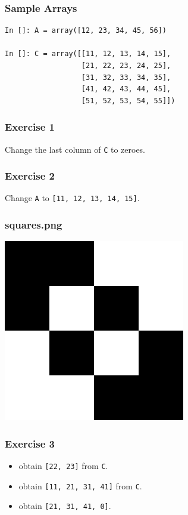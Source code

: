 \documentclass[presentation]{beamer}
\begin{document}
\begin{frame}[fragile]
\frametitle{Sample Arrays}
\label{sec-4}
\lstset{language=Python}
\begin{lstlisting}
In []: A = array([12, 23, 34, 45, 56])

In []: C = array([[11, 12, 13, 14, 15],
                  [21, 22, 23, 24, 25],
                  [31, 32, 33, 34, 35],
                  [41, 42, 43, 44, 45],
                  [51, 52, 53, 54, 55]])
\end{lstlisting}
\end{frame}
\begin{frame}
\frametitle{Exercise 1}
\label{sec-5}

  Change the last column of \verb~C~ to zeroes. 
\end{frame}
\begin{frame}
\frametitle{Exercise 2}
\label{sec-6}

  Change \verb~A~ to \verb~[11, 12, 13, 14, 15]~. 
\end{frame}
\begin{frame}
\frametitle{squares.png}
\label{sec-7}

    \begin{center}
      \includegraphics[scale=0.6]{squares}    
    \end{center}
\end{frame}
\begin{frame}
\frametitle{Exercise 3}
\label{sec-8}


\begin{itemize}
\item obtain \verb~[22, 23]~ from \verb~C~.
\item obtain \verb~[11, 21, 31, 41]~ from \verb~C~.
\item obtain \verb~[21, 31, 41, 0]~.
\end{itemize}
\end{frame}
\end{document}
